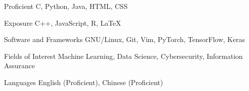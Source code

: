 

\begin{cvskills}

  \cvskill
    {Proficient} %
    {C, Python, Java, HTML, CSS} %

  \cvskill
    {Exposure} %
    {C++, JavaScript, R, LaTeX} %

  \cvskill
    {Software and Frameworks} %
    {GNU/Linux, Git, Vim, PyTorch, TensorFlow, Keras} %

  \cvskill
    {Fields of Interest} %
    {Machine Learning, Data Science, Cybersecurity, Information Assurance} %

  \cvskill
    {Languages} %
    {English (Proficient), Chinese (Proficient)} %


\end{cvskills}

